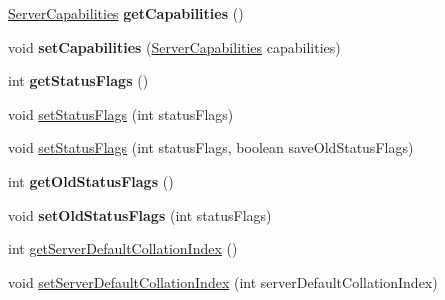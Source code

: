 \begin{DoxyCompactItemize}
\item 
\mbox{\label{interfacecom_1_1mysql_1_1cj_1_1protocol_1_1_server_session_a99f2361800e1d3df0a1ab516e4c80737}} 
\mbox{\hyperlink{interfacecom_1_1mysql_1_1cj_1_1protocol_1_1_server_capabilities}{Server\+Capabilities}} {\bfseries get\+Capabilities} ()
\item 
\mbox{\label{interfacecom_1_1mysql_1_1cj_1_1protocol_1_1_server_session_a061f04bcb0fbf1c553fd52639c62b1cc}} 
void {\bfseries set\+Capabilities} (\mbox{\hyperlink{interfacecom_1_1mysql_1_1cj_1_1protocol_1_1_server_capabilities}{Server\+Capabilities}} capabilities)
\item 
\mbox{\label{interfacecom_1_1mysql_1_1cj_1_1protocol_1_1_server_session_a9cba9b511a27892b6e860172734c7d70}} 
int {\bfseries get\+Status\+Flags} ()
\item 
void \mbox{\hyperlink{interfacecom_1_1mysql_1_1cj_1_1protocol_1_1_server_session_a855cbd715a8c33299d062a72fd75d8f4}{set\+Status\+Flags}} (int status\+Flags)
\item 
void \mbox{\hyperlink{interfacecom_1_1mysql_1_1cj_1_1protocol_1_1_server_session_acf86f0ae9cdfd88f758ec42bb72bf127}{set\+Status\+Flags}} (int status\+Flags, boolean save\+Old\+Status\+Flags)
\item 
\mbox{\label{interfacecom_1_1mysql_1_1cj_1_1protocol_1_1_server_session_a71070dd7715b9646cea4a81bd52e5376}} 
int {\bfseries get\+Old\+Status\+Flags} ()
\item 
\mbox{\label{interfacecom_1_1mysql_1_1cj_1_1protocol_1_1_server_session_a8ca3607d493b411a09825465bf202eda}} 
void {\bfseries set\+Old\+Status\+Flags} (int status\+Flags)
\item 
int \mbox{\hyperlink{interfacecom_1_1mysql_1_1cj_1_1protocol_1_1_server_session_a840bf74b75252459afd6b33ae21c8379}{get\+Server\+Default\+Collation\+Index}} ()
\item 
void \mbox{\hyperlink{interfacecom_1_1mysql_1_1cj_1_1protocol_1_1_server_session_aa712ac71a0771a45a3f8b46ceaac4178}{set\+Server\+Default\+Collation\+Index}} (int server\+Default\+Collation\+Index)

\end{DoxyCompactItemize}
